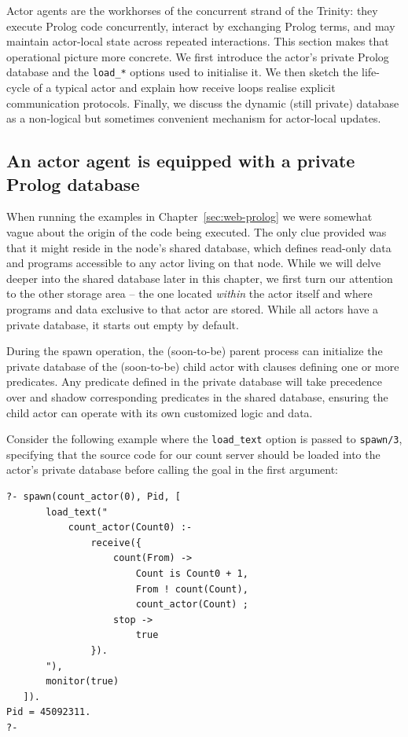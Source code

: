 Actor agents are the workhorses of the concurrent strand of the Trinity: they execute Prolog code concurrently, interact by exchanging Prolog terms, and may maintain actor-local state across repeated interactions. This section makes that operational picture more concrete. We first introduce the actor's private Prolog database and the \texttt{load\_*} options used to initialise it. We then sketch the life-cycle of a typical actor and explain how receive loops realise explicit communication protocols. Finally, we discuss the dynamic (still private) database as a non-logical but sometimes convenient mechanism for actor-local updates.


\subsection{An actor agent is equipped with a private Prolog database}\label{sec:private-db}

When running the examples in Chapter~\ref{sec:web-prolog} we were somewhat vague about the origin of the code being executed. The only clue provided was that it might reside in the node's shared database, which defines read-only data and programs accessible to any actor living on that node. While we will delve deeper into the shared database later in this chapter, we first turn our attention to the other storage area -- the one located \textit{within} the actor itself and where programs and data exclusive to that actor are stored. While all actors have a private database, it starts out empty by default. 

During the spawn operation, the (soon-to-be) parent process can initialize the private database of the (soon-to-be) child actor with clauses defining one or more predicates. Any predicate defined in the private database will take precedence over and shadow corresponding predicates in the shared database, ensuring the child actor can operate with its own customized logic and data.

Consider the following example where the \texttt{load\_text} option is passed to \texttt{spawn/3}, specifying that the source code for our count server should be loaded into the actor's private database before calling the goal in the first argument:

\begin{verbatim}
?- spawn(count_actor(0), Pid, [
       load_text("
           count_actor(Count0) :-                            
               receive({                         
                   count(From) ->
                       Count is Count0 + 1,              
                       From ! count(Count),              
                       count_actor(Count) ;
                   stop ->
                       true 
               }). 
       "),
       monitor(true)
   ]).
Pid = 45092311.
?-
\end{verbatim}

